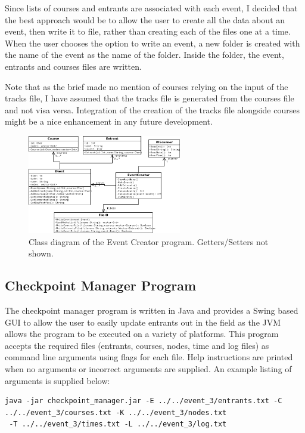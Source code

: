 \documentclass{article}
\begin{document}
Since lists of courses and entrants are associated with each event, I decided that the best approach would be to allow the user to create all the data about an event, then write it to file, rather than creating each of the files one at a time. When the user chooses the option to write an event, a new folder is created with the name of the event as the name of the folder. Inside the folder, the event, entrants and courses files are written.

Note that as the brief made no mention of courses relying on the input of the tracks file, I have assumed that the tracks file is generated from the courses file and not visa versa. Integration of the creation of the tracks file alongside courses might be a nice enhancement in any future development.


\begin{figure}[H]
\centering
\includegraphics[width=0.6\textwidth]{diagrams/event_creator.png}
\caption{Class diagram of the Event Creator program. Getters/Setters not shown.}
\label{fig:GUI-image}
\end{figure}

\subsection{Checkpoint Manager Program}
The checkpoint manager program is written in Java and provides a Swing based GUI to allow the user to easily update entrants out in the field as the JVM allows the program to be executed on a variety of platforms. This program accepts the required files (entrants, courses, nodes, time and log files) as command line arguments using flags for each file. Help instructions are printed when no arguments or incorrect arguments are supplied. An example listing of arguments is supplied below:

\begin{center}
	\begin{lstlisting}[showstringspaces=false]
java -jar checkpoint_manager.jar -E ../../event_3/entrants.txt -C ../../event_3/courses.txt -K ../../event_3/nodes.txt
 -T ../../event_3/times.txt -L ../../event_3/log.txt

	\end{lstlisting}
\end{center}
\end{document}
